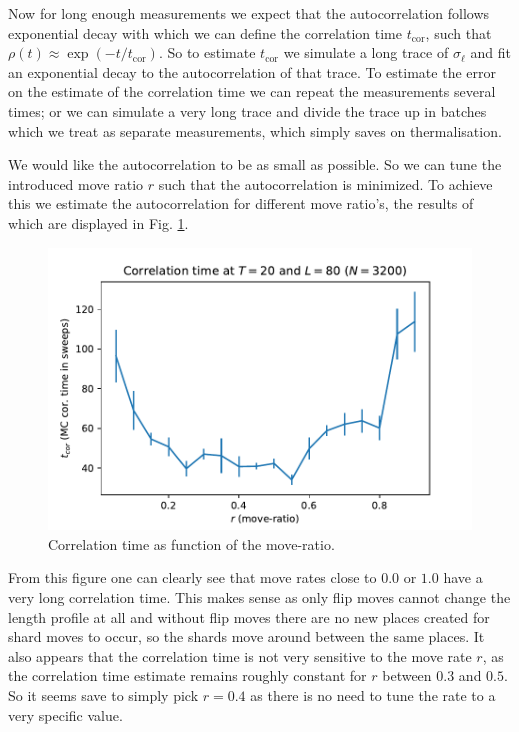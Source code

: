 Now for long enough measurements we expect that the autocorrelation follows exponential decay with which we can define the correlation time $t_\text{cor}$, such that $\rho(t) \approx \exp(- t / t_\text{cor})$.
So to estimate $t_\text{cor}$ we simulate a long trace of $\sigma_\ell$ and fit an exponential decay to the autocorrelation of that trace.
To estimate the error on the estimate of the correlation time we can repeat the measurements several times; or we can simulate a very long trace and divide the trace up in batches which we treat as separate measurements, which simply saves on thermalisation.

We would like the autocorrelation to be as small as possible. So we can tune the introduced move ratio $r$ such that the autocorrelation is minimized.
To achieve this we estimate the autocorrelation for different move ratio's, the results of which are displayed in Fig. \ref{fig:tcor_rdep}.
\begin{figure}[ht]
    \centering
    \includegraphics[width=0.7\linewidth]{img/tcor_r_t20_l80.pdf}
    \caption{Correlation time as function of the move-ratio.}
    \label{fig:tcor_rdep}
\end{figure}
From this figure one can clearly see that move rates close to $0.0$ or $1.0$ have a very long correlation time.
This makes sense as only flip moves cannot change the length profile at all and without flip moves there are no new places created for shard moves to occur, so the shards move around between the same places.
It also appears that the correlation time is not very sensitive to the move rate $r$, as the correlation time estimate remains roughly constant for $r$ between $0.3$ and $0.5$.
So it seems save to simply pick $r = 0.4$ as there is no need to tune the rate to a very specific value.

